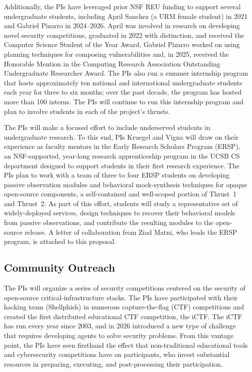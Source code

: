 Additionally, the PIs have leveraged prior NSF REU funding to support
several undergraduate students, including April Sanchez (a URM female
student) in 2021 and Gabriel Pizarro in 2024--2026. April was
involved in research on developing novel security competitions,
graduated in 2022 with distinction, and received the Computer Science
Student of the Year Award. Gabriel Pizarro worked on using planning
techniques for composing vulnerabilities and, in 2025, received the
Honorable Mention in the Computing Research Association Outstanding
Undergraduate Researcher Award. The PIs also run a summer internship
program that hosts approximately ten national and international
undergraduate students each year for three to six months; over the
past decade, the program has hosted more than 100 interns. The PIs
will continue to run this internship program and plan to involve
students in each of the project's thrusts.

The PIs will make a focused effort to include underserved students in
undergraduate research. To this end, PIs Kruegel and Vigna will draw
on their experience as faculty mentors in the Early Research Scholars
Program (ERSP), an NSF-supported, year-long research apprenticeship
program in the UCSB CS department designed to support students in
their first research experience. The PIs plan to work with a team of
three to four ERSP students on developing passive observation modules
and behavioral mock-synthesis techniques for opaque open-source
components, a self-contained and well-scoped portion of Thrust~1 and
Thrust~2. As part of this effort, students will study a representative
set of widely-deployed services, design techniques to recover their
behavioral models from passive observations, and contribute the
resulting modules to the \sysname open-source release. A letter of
collaboration from Ziad Matni, who leads the ERSP program, is
attached to this proposal.

\subsection{Community Outreach}

The PIs will organize a series of security competitions centered on
the security of open-source critical-infrastructure stacks. The PIs
have participated with their hacking team
(Shellphish) in numerous capture-the-flag (CTF) competitions and
created the first distributed educational CTF competition, the iCTF.
The iCTF has run every year since 2003, and in 2026 introduced a new
type of challenge that requires developing agents to solve security
problems. From this vantage point, the PIs have seen firsthand the
effect that non-traditional educational tools and cybersecurity
competitions have on participants, who invest substantial resources
in preparing, executing, and post-processing their participation.


